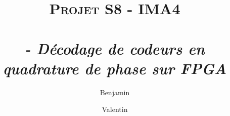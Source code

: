 \documentclass[12pt,twoside]{article}
\title{\textsc{\textbf{Projet S8}} - IMA4\\~\\
  \Large{\textit{\bsc{Rapport} - Décodage de codeurs en quadrature de phase sur FPGA}}
  }
\date{}
\author{
   Benjamin \bsc{Lafit}\and
   Valentin \bsc{vergez}
   }
\begin{document}
	\maketitle

	\renewcommand{\contentsname}{Table des matières}
	\tableofcontents %
	\newpage
	
%
	
%
	
\end{document}
